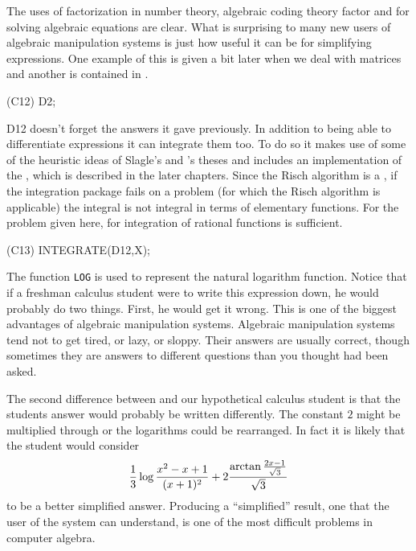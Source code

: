 The uses of factorization in number theory, algebraic coding theory
factor and for solving algebraic equations are clear.  What is
surprising to many new users of algebraic manipulation systems is just
how useful it can be for simplifying expressions.  One example of this
is given a bit later when we deal with matrices and another is
contained in .
\begin{code}
(C12) D2;
\end{code}
 {D12} 
{\Macsyma} doesn't forget the answers it gave previously.  In addition
to being able to differentiate expressions it can integrate them too.
To do so it makes use of some of the heuristic ideas of Slagle's and
{\MosesJ}'s theses \cite{Slagle:Thesis,Moses68} and includes an
implementation of the , which is described in
the later chapters.  Since the Risch algorithm is a , if the integration package fails on a problem (for which
the Risch algorithm is applicable) the integral is not integral in
terms of elementary functions.  For the problem given here,
 for integration of rational functions is
sufficient.
\begin{code}
(C13) INTEGRATE(D12,X);
\end{code}
The function {\tt LOG} is used to represent the natural logarithm function.
Notice that if a freshman calculus student were to write this expression
down, he would probably do two things.  First, he would get it wrong.  This
is one of the biggest advantages of algebraic manipulation systems.
Algebraic manipulation systems tend not to get tired, or lazy, or
sloppy.  Their answers are usually correct, though sometimes they are
answers to different questions than you thought had been asked.

The second difference between {\Macsyma} and our hypothetical calculus
student is that the students answer would probably be written differently.
The constant $2$ might be multiplied through or the logarithms could be
rearranged.  In fact it is likely that the student would consider 
\[
{1 \over 3} \log {x^2 - x + 1 \over (x+1)^2} 
+ 2 {\arctan {2 x - 1 \over \sqrt{3}} \over \sqrt{3}}
\]
to be a better simplified answer.  Producing a ``simplified'' result, one
that the user of the system can understand, is one of the most difficult
problems in computer algebra.  

